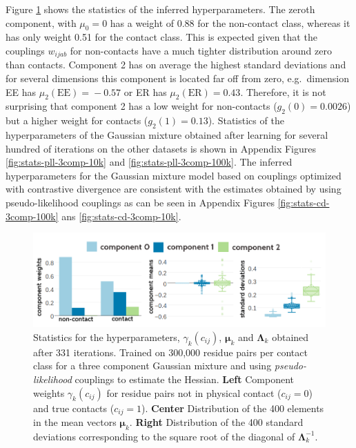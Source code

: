 \documentclass[11pt,a4paper,twoside]{book}
\newcommand{\eq}{\!=\!}
\newcommand{\Lk}{\mathbf{\Lambda}_k}
\newcommand{\muk}{\mathbf{\mu}_k}
\newcommand{\cij}{c_{ij}}
\newcommand{\wijab}{w_{ijab}}
\theoremstyle{definition}
\theoremstyle{definition}
\theoremstyle{remark}
\begin{document}
Figure \ref{fig:stats-pll-3comp-300k} shows the statistics of the
inferred hyperparameters. The zeroth component, with \(\mu_0=0\) has a
weight of 0.88 for the non-contact class, whereas it has only weight
0.51 for the contact class. This is expected given that the couplings
\(\wijab\) for non-contacts have a much tighter distribution around zero
than contacts. Component 2 has on average the highest standard
deviations and for several dimensions this component is located far off
from zero, e.g.~dimension EE has \(\mu_2(\text{EE}) \eq -0.57\) or ER
has \(\mu_2(\text{ER}) \eq 0.43\). Therefore, it is not surprising that
component 2 has a low weight for non-contacts (\(g_2(0) \eq 0.0026\))
but a higher weight for contacts (\(g_2(1) \eq 0.13\)). Statistics of
the hyperparameters of the Gaussian mixture obtained after learning for
several hundred of iterations on the other datasets is shown in Appendix
Figures \ref{fig:stats-pll-3comp-10k} and
\ref{fig:stats-pll-3comp-100k}. The inferred hyperparameters for the
Gaussian mixture model based on couplings optimized with contrastive
divergence are consistent with the estimates obtained by using
pseudo-likelihood couplings as can be seen in Appendix Figures
\ref{fig:stats-cd-3comp-100k} ans \ref{fig:stats-cd-3comp-10k}.












\begin{figure}
\includegraphics[width=1\linewidth]{img/bayesian_model/pll/3/stats-pll-3comp-300k} \caption{Statistics for the hyperparameters,
\(\gamma_k(\cij)\), \(\muk\) and \(\Lk\) obtained after 331 iterations.
Trained on 300,000 residue pairs per contact class for a three component
Gaussian mixture and using \emph{pseudo-likelihood} couplings to
estimate the Hessian. \textbf{Left} Component weights \(\gamma_k(\cij)\)
for residue pairs not in physical contact (\(\cij \eq 0\)) and true
contacts (\(\cij \eq 1\)). \textbf{Center} Distribution of the 400
elements in the mean vectors \(\muk\). \textbf{Right} Distribution of
the 400 standard deviations corresponding to the square root of the
diagonal of \(\Lk^{-1}\).}\label{fig:stats-pll-3comp-300k}
\end{figure}
\end{document}
